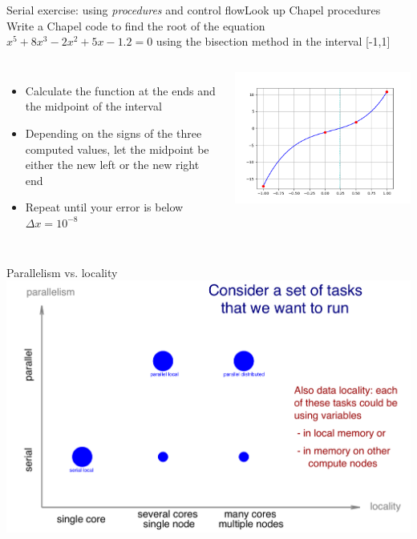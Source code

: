 \documentclass[10pt,xcolor=pdftex,dvipsnames,table]{beamer}
\begin{document}
\begin{frame}{Serial exercise: using {\it procedures} and control flow}{Look up Chapel procedures}
  Write a Chapel code to find the root of the equation $x^5 + 8x^3 - 2x^2 + 5x - 1.2 = 0$ using the bisection
  method in the interval [-1,1]
  \begin{columns}[]
    \begin{itemize}\setlength{\itemsep}{3mm}
      \item Calculate the function at the ends and the midpoint of the interval
      \item Depending on the signs of the three computed values, let the midpoint be either the new left
      or the new right end
      \item Repeat until your error is below $\Delta x=10^{-8}$
    \end{itemize}
    \includegraphics[width=0.95\columnwidth]{figs/bisection.png}
  \end{columns}
\end{frame}

\begin{frame}{Parallelism vs. locality}
  \includegraphics[width=1.0\columnwidth]{orthogonal.pdf}
\end{frame}
\end{document}
